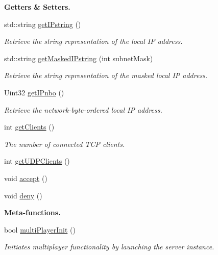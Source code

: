 \begin{Indent}{\bf Getters \& Setters.}
\begin{DoxyCompactItemize}
std\-::string \hyperlink{classNetManager_a96a48522e350bbf881f131e443c3079c}{get\-I\-Pstring} ()
\begin{DoxyCompactList}\small\item\em Retrieve the string representation of the local I\-P address. \end{DoxyCompactList}\item 
std\-::string \hyperlink{classNetManager_a3619e5825e0374cbef14531df09b6357}{get\-Masked\-I\-Pstring} (int subnet\-Mask)
\begin{DoxyCompactList}\small\item\em Retrieve the string representation of the masked local I\-P address. \end{DoxyCompactList}\item 
Uint32 \hyperlink{classNetManager_a0c1ce6d86b341f7586199fc1c3cdf933}{get\-I\-Pnbo} ()
\begin{DoxyCompactList}\small\item\em Retrieve the network-\/byte-\/ordered local I\-P address. \end{DoxyCompactList}\item 
int \hyperlink{classNetManager_a3a0e39e551ae5d3feb67834292ed8a77}{get\-Clients} ()
\begin{DoxyCompactList}\small\item\em The number of connected T\-C\-P clients. \end{DoxyCompactList}\item 
int \hyperlink{classNetManager_a785826341013e957efbff6d6581c6d56}{get\-U\-D\-P\-Clients} ()
\item 
void \hyperlink{classNetManager_a50f4e84864428bc19f0a06109a8b7b30}{accept} ()
\item 
void \hyperlink{classNetManager_a2b644ad9f858c73ba78a7047fbb55abd}{deny} ()
\end{DoxyCompactItemize}
\end{Indent}
\begin{Indent}{\bf Meta-\/functions.}\par
\begin{DoxyCompactItemize}
\item 
bool \hyperlink{classNetManager_a6bbb485cb4ddab15dac4405df32f0482}{multi\-Player\-Init} ()
\begin{DoxyCompactList}\small\item\em Initiates multiplayer functionality by launching the server instance. \end{DoxyCompactList}\end{DoxyCompactItemize}
\end{Indent}
